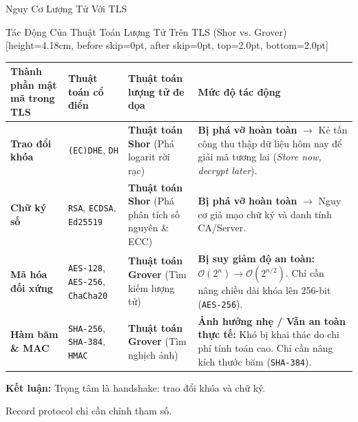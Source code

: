\documentclass[aspectratio=169, 10pt]{beamer}
\begin{document}
\begin{frame}{Nguy Cơ Lượng Tử Với TLS}
	\begin{accentcard}[uetblue]{Tác Động Của Thuật Toán Lượng Tử Trên TLS (Shor vs. Grover)}[height=4.18cm, before skip=0pt, after skip=0pt, top=2.0pt, bottom=2.0pt]
		\centering
		\fontsize{5.7pt}{6.95pt}\selectfont
		\renewcommand{\arraystretch}{1.10}
		\setlength{\tabcolsep}{2.5pt}
		\begin{tabularx}{\linewidth}{>{\raggedright\arraybackslash}p{2.1cm} >{\raggedright\arraybackslash}p{2.2cm} >{\raggedright\arraybackslash}p{2.6cm} >{\raggedright\arraybackslash}X}
			\toprule
			\rowcolor{uetaccentbg}
			\textbf{\color{uetblue}Thành phần mật mã trong TLS} & \textbf{\color{uetblue}Thuật toán cổ điển} & \textbf{\color{uetblue}Thuật toán lượng tử đe dọa} & \textbf{\color{uetblue}Mức độ tác động} \\
			\midrule
			\textbf{Trao đổi khóa} & \texttt{(EC)DHE}, \texttt{DH} & \textbf{Thuật toán Shor} (Phá logarit rời rạc) & \textbf{\color{uetred}Bị phá vỡ hoàn toàn} $\rightarrow$ Kẻ tấn công thu thập dữ liệu hôm nay để giải mã tương lai (\textit{Store now, decrypt later}). \\
			\rowcolor{uetlightgray}
			\textbf{Chữ ký số} & \texttt{RSA}, \texttt{ECDSA}, \texttt{Ed25519} & \textbf{Thuật toán Shor} (Phá phân tích số nguyên \& ECC) & \textbf{\color{uetred}Bị phá vỡ hoàn toàn} $\rightarrow$ Nguy cơ giả mạo chữ ký và danh tính CA/Server. \\
			\textbf{Mã hóa đối xứng} & \texttt{AES-128}, \texttt{AES-256}, \texttt{ChaCha20} & \textbf{Thuật toán Grover} (Tìm kiếm lượng tử) & \textbf{Bị suy giảm độ an toàn:} $\mathcal{O}(2^n) \rightarrow \mathcal{O}(2^{n/2})$. Chỉ cần nâng chiều dài khóa lên 256-bit (\texttt{AES-256}). \\
			\rowcolor{uetlightgray}
			\textbf{Hàm băm \& MAC} & \texttt{SHA-256}, \texttt{SHA-384}, \texttt{HMAC} & \textbf{Thuật toán Grover} (Tìm nghịch ảnh) & \textbf{Ảnh hưởng nhẹ / Vẫn an toàn thực tế:} Khó bị khai thác do chi phí tính toán cao. Chỉ cần nâng kích thước băm (\texttt{SHA-384}). \\
			\bottomrule
		\end{tabularx}
	\end{accentcard}\par\nointerlineskip\vspace{0.08cm}\noindent
	\begin{uetcard}[colback=uetaccentbg, height=1.08cm, before skip=0pt, after skip=0pt, valign=center, top=2.0pt, bottom=2.0pt, left=6pt, right=6pt]
		\raggedright\fontsize{5.9pt}{7.2pt}\selectfont
		\textbf{\color{uetblue}Kết luận:} Trọng tâm là handshake: trao đổi khóa và chữ ký.\par
		Record protocol chỉ cần chỉnh tham số.
	\end{uetcard}
\end{frame}
\end{document}
